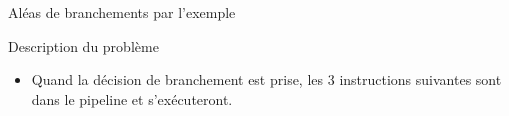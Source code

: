 %
\begin{Frame}{Aléas de branchements par l'exemple}

\begin{block}{Description du problème}
       \begin{center}
 	\begin{itemize}
          \item Quand la décision de branchement est prise, les 3 instructions suivantes sont dans le pipeline et s'exécuteront.
        \end{itemize}
       \end{center}
      \end{block}   

\vspace{-0.1cm}
        \begin{center}
        \end{center}
 


\end{Frame}


